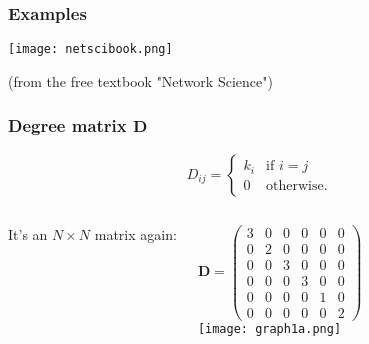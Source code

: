 \documentclass[10pt,aspectratio=169,dvipsnames]{beamer}
\begin{document}
\begin{frame}
\frametitle{Examples}

\texttt{[image: netscibook.png]}

(from the free textbook "Network Science")
\end{frame}
%


\begin{frame}
\frametitle{Degree matrix $\mathbf{D}$}
\begin{equation*}
D_{ij} = \begin{cases}k_i  &\mbox{if } i=j\\
0 & \mbox{otherwise}. \end{cases}
\end{equation*}
\begin{columns}

  It's an $N \times N$ matrix again:

\begin{equation*}
\mathbf{D}=\left(\begin{matrix}
3 & 0 & 0 & 0 & 0 & 0\\
0 & 2 & 0 & 0 & 0 & 0\\
0 & 0 & 3 & 0 & 0 & 0\\
0 & 0 & 0 & 3 & 0 & 0\\
0 & 0 & 0 & 0 & 1 & 0\\
0 & 0 & 0 & 0 & 0 & 2
\end{matrix}\right)
\end{equation*}
\texttt{[image: graph1a.png]}
  \end{columns}
\end{frame}
\end{document}

